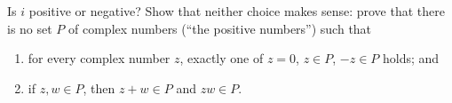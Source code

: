 Is $i$ positive or negative? Show that neither choice makes sense: prove that there is no set $P$ of complex numbers (``the positive numbers'') such that
\begin{enumerate}
\item[(i)] for every complex number $z$, exactly one of $z=0$, $z\in P$, $-z\in P$ holds; and
\item[(ii)] if $z,w\in P$, then $z+w\in P$ and $zw\in P$.
\end{enumerate}
